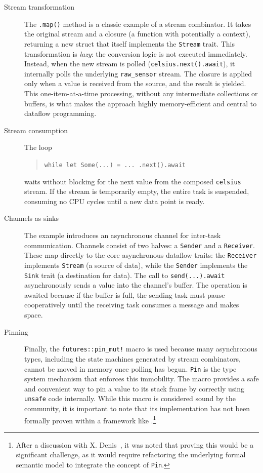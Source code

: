\begin{description}
    \item[Stream transformation] The \texttt{.map()} method is a classic example of a stream
          combinator. It takes the original stream and a closure (a function with potentially a
          context), returning a new struct that itself implements the \texttt{Stream} trait. This
          transformation is \emph{lazy}: the conversion logic is not executed immediately. Instead,
          when the new stream is polled (\via \texttt{celsius.next().await}), it internally polls
          the underlying \texttt{raw\_sensor} stream. The closure is applied only when a value is
          received from the source, and the result is yielded. This one-item-at-a-time processing,
          without any intermediate collections or buffers, is what makes the approach highly
          memory-efficient and central to dataflow programming.

    \item[Stream consumption] The loop
          \begin{quote}
              \texttt{while let Some(...) = ... .next().await}
          \end{quote}
          waits without blocking for the next value from the composed \texttt{celsius}
          stream. If the stream is temporarily empty, the entire task is suspended,
          consuming no CPU cycles until a new data point is ready.

    \item[Channels as sinks] The example introduces an asynchronous channel for
          inter-task communication. Channels consist of two halves: a \texttt{Sender} and a
          \texttt{Receiver}. These map directly to the core asynchronous dataflow traits:
          the \texttt{Receiver} implements \texttt{Stream} (a source of data), while the
          \texttt{Sender} implements the \texttt{Sink} trait (a destination for data). The
          call to \texttt{send(...).await} asynchronously sends a value into the channel's
          buffer. The operation is awaited because if the buffer is full, the sending task
          must pause cooperatively until the receiving task consumes a message and makes space.

    \item[Pinning] Finally, the \texttt{futures::pin\_mut!} macro is used because many
          asynchronous types, including the state machines generated by stream combinators,
          cannot be moved in memory once polling has begun. \texttt{Pin} is the type system
          mechanism that enforces this immobility. The macro provides a safe and convenient
          way to pin a value to its stack frame by correctly using \texttt{unsafe} \Rust
          code internally. While this macro is considered sound by the \Rust community, it
          is important to note that its implementation has not been formally proven within a
          framework like \RustBelt.\footnote{After a discussion with X. Denis~\cite{DBLP:conf/pldi/MatsushitaDJD22},
              it was noted that proving this would be a significant challenge, as it would
              require refactoring the underlying formal semantic model to integrate the concept
              of \texttt{Pin}.}
\end{description}

